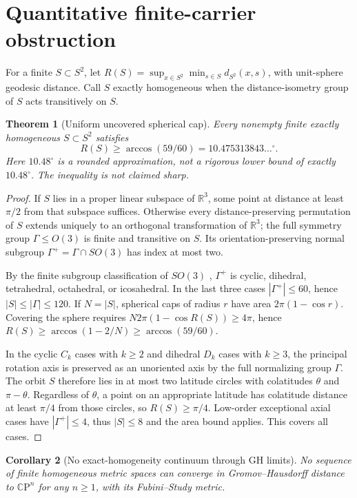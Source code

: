 \documentclass[11pt,letterpaper]{article}
\newtheorem{theorem}{Theorem}
\newtheorem{corollary}[theorem]{Corollary}
\newcommand{\CP}{\mathbb C\mathrm P}
\begin{document}
\section{Quantitative finite-carrier obstruction}
For a finite \(S\subset S^2\), let \(R(S)=\sup_{x\in S^2}\min_{s\in S}d_{S^2}(x,s)\), with unit-sphere geodesic distance. Call \(S\) exactly homogeneous when the distance-isometry group of \(S\) acts transitively on \(S\).
\begin{theorem}[Uniform uncovered spherical cap]\label{thm:cap}
Every nonempty finite exactly homogeneous \(S\subset S^2\) satisfies
\[
\boxed{R(S)\ge\arccos(59/60)=10.475313843\ldots^\circ.}
\]
Here \(10.48^\circ\) is a \emph{rounded approximation}, not a rigorous lower bound of exactly \(10.48^\circ\). The inequality is not claimed sharp.
\end{theorem}
\begin{proof}
If \(S\) lies in a proper linear subspace of \(\mathbb R^3\), some point at distance at least \(\pi/2\) from that subspace suffices. Otherwise every distance-preserving permutation of \(S\) extends uniquely to an orthogonal transformation of \(\mathbb R^3\); the full symmetry group \(\Gamma\le O(3)\) is finite and transitive on \(S\). Its orientation-preserving normal subgroup \(\Gamma^+=\Gamma\cap SO(3)\) has index at most two.

By the finite subgroup classification of \(SO(3)\) \cite{bui}, \(\Gamma^+\) is cyclic, dihedral, tetrahedral, octahedral, or icosahedral. In the last three cases \(|\Gamma^+|\le60\), hence \(|S|\le|\Gamma|\le120\). If \(N=|S|\), spherical caps of radius \(r\) have area \(2\pi(1-\cos r)\). Covering the sphere requires \(N2\pi(1-\cos R(S))\ge4\pi\), hence
\(R(S)\ge\arccos(1-2/N)\ge\arccos(59/60)\).

In the cyclic $C_k$ cases with $k\ge2$ and dihedral $D_k$ cases with $k\ge3$, the principal rotation axis is preserved as an unoriented axis by the full normalizing group \(\Gamma\). The orbit \(S\) therefore lies in at most two latitude circles with colatitudes \(\theta\) and \(\pi-\theta\). Regardless of \(\theta\), a point on an appropriate latitude has colatitude distance at least \(\pi/4\) from those circles, so \(R(S)\ge\pi/4\). Low-order exceptional axial cases have \(|\Gamma^+|\le4\), thus \(|S|\le8\) and the area bound applies. This covers all cases.
\end{proof}
\begin{corollary}[No exact-homogeneity continuum through GH limits]\label{cor:gelander}
No sequence of finite homogeneous metric spaces can converge in Gromov--Hausdorff distance to \(\CP^n\) for any \(n\ge1\), with its Fubini--Study metric.
\end{corollary}
\end{document}
